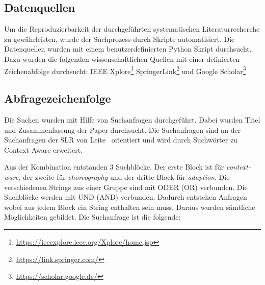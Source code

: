 \documentclass[conference,compsoc]{IEEEtran}
\begin{document}
%
%
%
%


\subsection{Datenquellen}
Um die Reproduzierbarkeit der durchgeführten systematischen Literaturrecherche zu gewährleisten, wurde der Suchprozess durch Skripte automatisiert. Die Datenquellen wurden mit einem benutzerdefinierten Python Skript durchsucht. Dazu wurden die folgenden wissenschaftlichen Quellen mit einer definierten Zeichenabfolge durchsucht: IEEE Xplore\footnote{\url{https://ieeexplore.ieee.org/Xplore/home.jsp}} SpringerLink\footnote{\url{https://link.springer.com/}} und Google Scholar\footnote{\url{https://scholar.google.de/}}


\subsection{Abfragezeichenfolge}
\label{section:suchanfrage}
Die Suchen wurden mit Hilfe von Suchanfragen durchgeführt. Dabei wurden Titel und Zusammenfassung der Paper durchsucht.
Die Suchanfragen sind an der Suchanfragen der SLR von Leite~\cite{leite2013systematic} orientiert und wird durch Suchwörter zu Context Aware erweitert.

Aus der Kombination entstanden 3 Suchblöcke. Der erste Block ist für \textit{context-ware}, der zweite für \textit{choreography} und der dritte Block für \textit{adaption}. Die verschiedenen Strings aus einer Gruppe sind mit ODER (OR) verbunden. Die Suchblöcke werden mit UND (AND) verbunden. Dadurch entstehen Anfragen wobei aus jedem Block ein String enthalten sein muss. Daraus wurden sämtliche Möglichkeiten gebildet. 
Die Suchanfrage ist die folgende: \\
\end{document}
